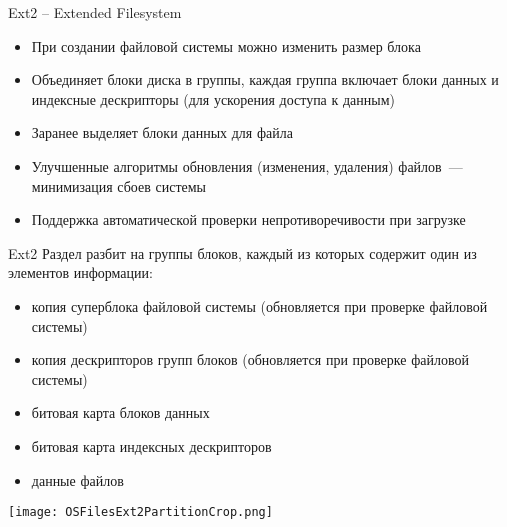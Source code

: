 \documentclass[aspectratio=169,14pt]{beamer}
\begin{document}
\begin{frame}{Ext2 – Extended Filesystem}
    \begin{itemize}
        \item При создании файловой системы можно изменить размер блока
        \item Объединяет блоки диска в группы, каждая группа включает блоки
        данных и индексные дескрипторы (для ускорения доступа к данным)
        \item Заранее выделяет блоки данных для файла
        \item Улучшенные алгоритмы обновления (изменения, удаления) файлов~---
        минимизация сбоев системы
        \item Поддержка автоматической проверки непротиворечивости при загрузке
    \end{itemize}
\end{frame}

\begin{frame}{Ext2}
    Раздел разбит на группы блоков, каждый из которых содержит один из
    элементов информации:
    \begin{footnotesize}
        \begin{itemize}
            \item копия суперблока файловой системы (обновляется при
            проверке файловой системы)
            \item копия дескрипторов групп блоков (обновляется при проверке
            файловой системы)
            \item битовая карта блоков данных
            \item битовая карта индексных дескрипторов
            \item данные файлов
        \end{itemize}
        \texttt{[image: OSFilesExt2PartitionCrop.png]}
    \end{footnotesize}
\end{frame}
\end{document}
